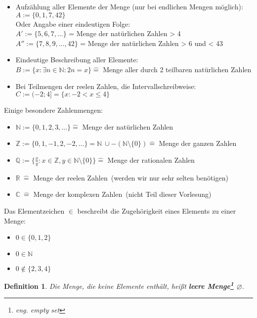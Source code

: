 \documentclass[12pt,german,a4]{article}
\begin{document}
\begin{itemize}
\item Aufzählung aller Elemente der Menge (nur bei endlichen Mengen möglich):\\
$A := \{0, 1, 7, 42\}$\\
Oder Angabe einer eindeutigen Folge:\\
$A' := \{5, 6, 7, ...\}$ = \glqq Menge der natürlichen Zahlen > 4\grqq\\
$A'' := \{7, 8, 9, ..., 42\}$ = \glqq Menge der natürlichen Zahlen > 6 und < 43\grqq
\item Eindeutige Beschreibung aller Elemente:\\
$B := \{x: \exists n \in \mathbb{N}: 2n = x\} \hat{=}$ \glqq Menge aller durch 2 teilbaren natürlichen Zahlen\grqq
\item Bei Teilmengen der reelen Zahlen, die Intervallschreibweise:\\
$C := (-2; 4] = \{x : -2 < x \le 4\}$
\end{itemize}
\pagebreak
Einige besondere Zahlenmengen:
\begin{itemize}
\item $\mathbb{N} := \{0, 1, 2, 3, ...\} \hat{=}$ \glqq Menge der natürlichen Zahlen\grqq
\item $\mathbb{Z} := \{0, 1, -1, 2, -2, ...\} = \mathbb{N}\ \cup -(\mathbb{N} \setminus \{0\}) \hat{=}$ \glqq Menge der ganzen Zahlen\grqq
\item $\mathbb{Q} := \{\frac{x}{y} : x \in \mathbb{Z}, y \in \mathbb{N} \setminus \{0\}\} \hat{=}$ \glqq Menge der rationalen Zahlen\grqq
\item $\mathbb{R}\ \hat{=}$ \glqq Menge der reelen Zahlen\grqq\ (werden wir nur sehr selten benötigen)
\item $\mathbb{C}\ \hat{=}$ \glqq Menge der komplexen Zahlen\grqq\ (nicht Teil dieser Vorlesung)
\end{itemize}

Das Elementzeichen $\in$ beschreibt die Zugehörigkeit eines Elements zu einer Menge:
\begin{itemize}
\item $0 \in \{0, 1, 2\}$
\item $0 \in \mathbb{N}$
\item $0 \not\in \{2, 3, 4\}$
\end{itemize}

\newtheorem{defEmptySet}[defSet]{Definition}
\begin{defEmptySet}
Die Menge, die keine Elemente enthält, heißt {\bf leere Menge\footnote{eng. empty set} $\varnothing$}.
\end{defEmptySet}
\end{document}
